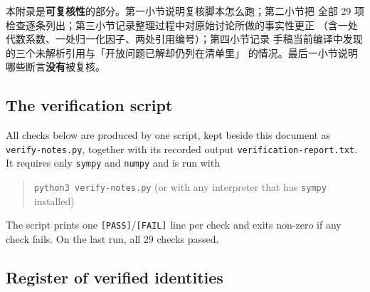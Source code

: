
\sloppy
\begin{cnread}
本附录是\textbf{可复核性}的部分。第一小节说明复核脚本怎么跑；第二小节把
全部 29 项检查逐条列出；第三小节记录整理过程中对原始讨论所做的事实性更正
（含一处代数系数、一处归一化因子、两处引用编号）；第四小节记录
\AEG{} 手稿当前编译中发现的三个未解析引用与「开放问题已解却仍列在清单里」
的情况。最后一小节说明哪些断言\textbf{没有}被复核。
\end{cnread}

\subsection{The verification script}

All checks below are produced by one script, kept beside this document as
\texttt{verify-notes.py}, together with its recorded output
\texttt{verification-report.txt}.  It requires only \texttt{sympy} and
\texttt{numpy} and is run with

\begin{quote}\small
\texttt{python3 verify-notes.py} \quad (or with any interpreter that has
\texttt{sympy} installed)
\end{quote}

The script prints one \texttt{[PASS]}/\texttt{[FAIL]} line per check and exits
non-zero if any check fails.  On the last run, all $29$ checks passed.

\subsection{Register of verified identities}

